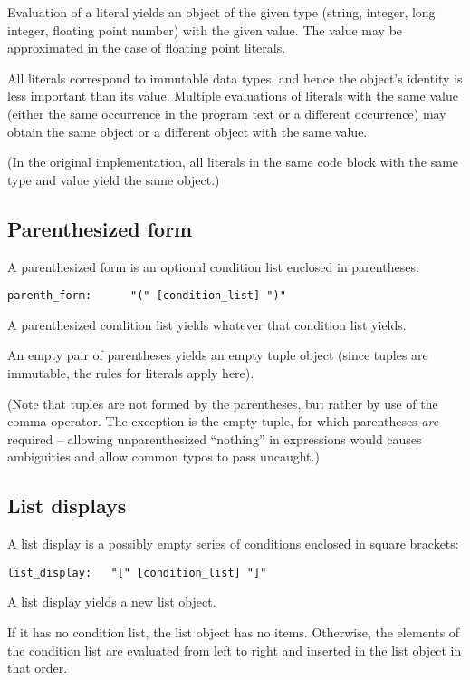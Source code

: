 Evaluation of a literal yields an object of the given type
(string, integer, long integer, floating point number)
with the given value.
The value may be approximated in the case of floating point literals.

All literals correspond to immutable data types, and hence the
object's identity is less important than its value.  Multiple
evaluations of literals with the same value (either the same
occurrence in the program text or a different occurrence) may obtain
the same object or a different object with the same value.

(In the original implementation, all literals in the same code block
with the same type and value yield the same object.)

\subsection{Parenthesized form}

A parenthesized form is an optional condition list enclosed in
parentheses:

\begin{verbatim}
parenth_form:      "(" [condition_list] ")"
\end{verbatim}

A parenthesized condition list yields whatever that condition list
yields.

An empty pair of parentheses yields an empty tuple object (since
tuples are immutable, the rules for literals apply here).

(Note that tuples are not formed by the parentheses, but rather by use
of the comma operator.  The exception is the empty tuple, for which
parentheses {\em are} required -- allowing unparenthesized ``nothing''
in expressions would causes ambiguities and allow common typos to
pass uncaught.)

\subsection{List displays}

A list display is a possibly empty series of conditions enclosed in
square brackets:

\begin{verbatim}
list_display:   "[" [condition_list] "]"
\end{verbatim}

A list display yields a new list object.

If it has no condition list, the list object has no items.
Otherwise, the elements of the condition list are evaluated
from left to right and inserted in the list object in that order.

